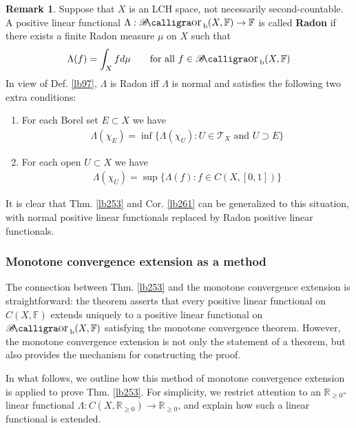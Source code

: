 \documentclass[12pt,b5paper,notitlepage]{article}
\theoremstyle{definition}
\newtheorem{rem}[df]{Remark}
\theoremstyle{plain}
\DeclareMathOperator{\Borb}{{\mathscr{B}\text{\kern -2pt {\calligra\large or}}\,}_{\mathrm b}}
\newcommand{\Rbb}{\mathbb R}
\newcommand{\Fbb}{\mathbb F}
\newcommand{\MT}{\mathcal T}
\numberwithin{equation}{section}
\begin{document}
\begin{rem}\label{lb275}
Suppose that $X$ is an LCH space, not necessarily second-countable. A positive linear functional $\Lambda:\Borb(X,\Fbb)\rightarrow\Fbb$ is called \textbf{Radon}  if there exists a finite Radon measure $\mu$ on $X$ such that
\begin{align*}
\Lambda(f)=\int_X fd\mu\qquad\text{for all }f\in\Borb(X,\Fbb)
\end{align*}
In view of Def. \ref{lb97}, $\Lambda$ is Radon iff $\Lambda$ is normal and satisfies the following two extra conditions:
\begin{enumerate}[label=(\alph*)]
\item For each Borel set $E\subset X$ we have
\begin{align*}
\Lambda(\chi_E)=\inf\big\{\Lambda(\chi_U):U\in\MT_X\text{ and }U\supset E  \big\}
\end{align*} 
\item For each open $U\subset X$ we have
\begin{align*}
\Lambda(\chi_U)=\sup\big\{\Lambda(f):f\in C(X,[0,1])  \big\}
\end{align*}
\end{enumerate}
It is clear that Thm. \ref{lb253} and Cor. \ref{lb261} can be generalized to this situation, with normal positive linear functionals replaced by Radon positive linear functionals.
\end{rem}



\subsubsection{Monotone convergence extension as a method}


The connection between Thm. \ref{lb253} and the monotone convergence extension is straightforward: the theorem asserts that every positive linear functional on $C(X,\Fbb)$ extends uniquely to a positive linear functional on $\Borb(X,\Fbb)$ satisfying the monotone convergence theorem. However, the monotone convergence extension is not only the statement of a theorem, but also provides the mechanism for constructing the proof. 

In what follows, we outline how this method of monotone convergence extension is applied to prove Thm. \ref{lb253}. For simplicity, we restrict attention to an $\Rbb_{\geq0}$-linear functional $\Lambda:C(X,\Rbb_{\geq0})\rightarrow\Rbb_{\geq0}$, and explain how such a linear functional is extended.
\end{document}
